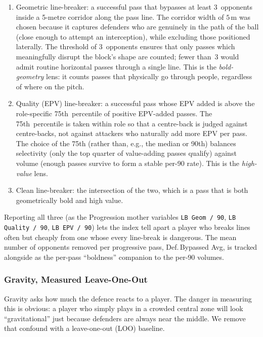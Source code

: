 \documentclass[12pt,a4paper]{article}
\begin{document}
\begin{enumerate}
    \item Geometric line-breaker: a successful pass that bypasses at least 3~opponents inside a 5-metre corridor along the pass line. The corridor width of $5$\,m was chosen because it captures defenders who are genuinely in the path of the ball (close enough to attempt an interception), while excluding those positioned laterally. The threshold of 3~opponents ensures that only passes which meaningfully disrupt the block's shape are counted; fewer than~3 would admit routine horizontal passes through a single line. This is the \emph{bold-geometry} lens: it counts passes that physically go through people, regardless of where on the pitch.
    \item Quality (EPV) line-breaker: a successful pass whose EPV added is above the role-specific 75th~percentile of positive EPV-added passes. The 75th~percentile is taken within role so that a centre-back is judged against centre-backs, not against attackers who naturally add more EPV per pass. The choice of the 75th (rather than, e.g., the median or 90th) balances selectivity (only the top quarter of value-adding passes qualify) against volume (enough passes survive to form a stable per-90 rate). This is the \emph{high-value} lens.
    \item Clean line-breaker: the intersection of the two, which is a pass that is both geometrically bold and high value.
\end{enumerate}

Reporting all three (as the Progression mother variables \texttt{LB Geom\,/\,90}, \texttt{LB Quality\,/\,90}, \texttt{LB EPV\,/\,90}) lets the index tell apart a player who breaks lines often but cheaply from one whose every line-break is dangerous.
The mean number of opponents removed per progressive pass, Def.\,Bypassed Avg, is tracked alongside as the per-pass ``boldness'' companion to the per-90 volumes.

\subsubsection{Gravity, Measured Leave-One-Out}\label{sec:gravity-block}

Gravity asks how much the defence reacts to a player.
The danger in measuring this is obvious: a player who simply plays in a crowded central zone will look ``gravitational'' just because defenders are always near the middle.
We remove that confound with a leave-one-out (LOO) baseline.
\end{document}
